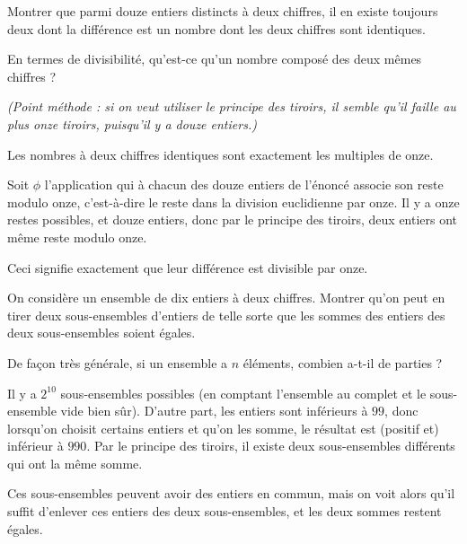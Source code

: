 \begin{exo}
Montrer que parmi douze entiers distincts à deux chiffres, il en existe toujours deux dont la différence est un nombre dont les deux chiffres sont identiques.
\begin{hint}
En termes de divisibilité, qu'est-ce qu'un nombre composé des deux mêmes chiffres ?
\end{hint}
\begin{sol}
\emph{(Point méthode : si on veut utiliser le principe des tiroirs, il semble qu'il faille au plus onze \og tiroirs\fg, puisqu'il y a douze entiers.)}


Les nombres à deux chiffres identiques sont exactement les multiples de onze.

Soit $\phi$ l'application qui à chacun des douze entiers de l'énoncé associe son reste modulo onze, c'est-à-dire le reste dans la division euclidienne par onze. Il y a onze restes possibles, et douze entiers, donc par le principe des tiroirs, deux entiers ont même reste modulo onze.

Ceci signifie exactement que leur différence est divisible par onze.


\end{sol}
\end{exo}



\begin{exo}
On considère un ensemble de dix entiers  à deux chiffres. Montrer qu'on peut en tirer deux sous-ensembles d'entiers de telle sorte que les sommes des entiers des deux sous-ensembles soient égales.
\begin{hint}
De façon très générale, si un ensemble a $n$ éléments, combien a-t-il de parties ?
\end{hint}
\begin{sol}
Il y a $2^{10}$ sous-ensembles possibles (en comptant l'ensemble au complet et le sous-ensemble vide bien sûr). D'autre part, les entiers sont inférieurs à $99$, donc lorsqu'on choisit certains entiers et qu'on les somme, le résultat est (positif et) inférieur à $990$. Par le principe des tiroirs, il existe deux sous-ensembles différents qui ont la même somme.

Ces sous-ensembles peuvent avoir des entiers en commun, mais on voit alors qu'il suffit d'enlever ces entiers des deux sous-ensembles, et les deux sommes restent égales.
\end{sol}
\end{exo}

